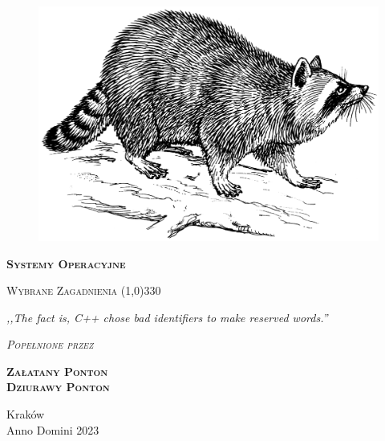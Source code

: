 \begin{titlepage} 
    \begin{center}
         \begin{figure}[h]
            \centering
            \includegraphics[scale=0.8]{img/raccoon.png}
        \end{figure}
        
        \Huge
        \textbf{\textsc{Systemy Operacyjne}}
        
        \vspace{0.5cm}
        \Large
        \textsc{Wybrane Zagadnienia}
        \line(1,0){330}
        
        \normalsize
        
        \vspace{1cm}
        \textit{,,The fact is, C++ chose bad identifiers to make reserved words.''}
        \vspace{1cm}

        \textit{\textsc{Popełnione przez}}\\
        \vspace{5mm}
  
        \textbf{\textsc{Załatany Ponton \\ Dziurawy Ponton}}
 
        \vfill

        Kraków \\
        Anno Domini 2023
    \end{center}
\end{titlepage}